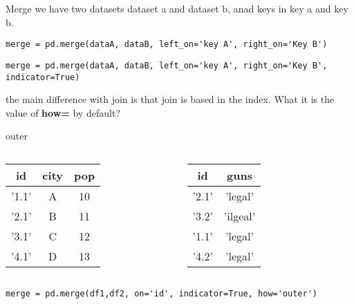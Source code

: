 \documentclass{beamer}
\begin{document}
\begin{frame}[fragile]{Merge}
we have two datasets dataset a and dataset b, anad keys in key a and key b.
\begin{lstlisting}
merge = pd.merge(dataA, dataB, left_on='key A', right_on='Key B')
\end{lstlisting}


\begin{lstlisting}
merge = pd.merge(dataA, dataB, left_on='key A', right_on='Key B', indicator=True)
\end{lstlisting}

the main difference with join is that join is based in the index.
What it is the value of \textbf{how=} by default?
\end{frame}


\begin{frame}[fragile]{outer}
\begin{columns}
\begin{table}[]
\begin{tabular}{ccc}
\textbf{id} & \textbf{city} & \textbf{pop} \\ \hline
'1.1'       & A             & 10           \\
'2.1'       & B             & 11           \\
'3.1'       & C             & 12           \\
'4.1'       & D             & 13          
\end{tabular}
\end{table}



\begin{table}[]
\begin{tabular}{cc}
\textbf{id}  & \textbf{guns} \\ \hline
'2.1'                 & 'legal'           \\
'3.2'                 & 'ilgeal'         \\
'1.1'                 & 'legal'         \\
'4.2'                 & 'legal'      
\end{tabular}
\end{table}
\end{columns}

\begin{lstlisting}
merge = pd.merge(df1,df2, on='id', indicator=True, how='outer')
\end{lstlisting}


\end{frame}
\end{document}
